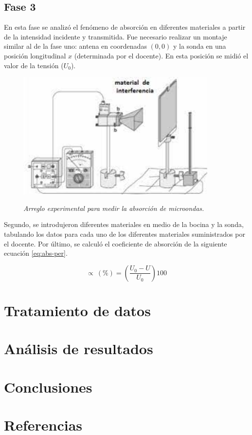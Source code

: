 \documentclass[spanish,notitlepage,letterpaper, 12pt]{article}
\begin{document}
\subsection{Fase 3}
En esta fase se analizó el fenómeno de absorción en diferentes materiales a
partir de la intensidad incidente y transmitida. Fue necesario realizar un montaje similar
al de la fase uno: antena en coordenadas $(0,0)$ y la sonda en una posición longitudinal $x$
(determinada por el docente). En esta posición se midió el valor de la tensión ($U_0$).\par
\newpage
\begin{figure}[!ht]
    \centering
    \includegraphics[width=10.0cm]{images/montaje3.jpeg}
    \label{fig:montaje3}
    \caption{\textit{Arreglo experimental para medir la absorción de microondas.}}
\end{figure}
Segundo, se introdujeron diferentes materiales en medio de la bocina y la sonda,
tabulando los datos para cada uno de los diferentes materiales suministrados
por el docente. Por último, se calculó el coeficiente de absorción de la siguiente
ecuación \eqref{eq:abs-per}.\par
\begin{equation}\label{eq:abs-per}
    \propto\ (\%)=(\frac{U_0-U}{U_0})100
\end{equation}
\section{Tratamiento de datos} \label{TD}
\section{Análisis de resultados}
\section{Conclusiones}
\section{Referencias} 


\end{document}
